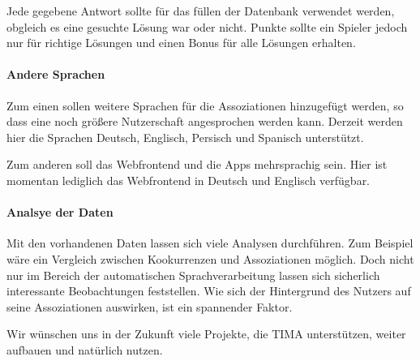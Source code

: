 Jede gegebene Antwort sollte für das füllen der Datenbank verwendet werden, obgleich
es eine gesuchte Lösung war oder nicht. Punkte sollte ein Spieler jedoch nur
für richtige Lösungen und einen Bonus für alle Lösungen erhalten.

\paragraph{Andere Sprachen}
Zum einen sollen weitere Sprachen für die Assoziationen hinzugefügt werden, so dass eine noch größere Nutzerschaft angesprochen werden kann. Derzeit werden hier die Sprachen Deutsch, Englisch, Persisch und Spanisch unterstützt.

Zum anderen soll das Webfrontend und die Apps mehrsprachig sein. Hier ist momentan lediglich das Webfrontend in Deutsch und Englisch verfügbar.

\paragraph{Analsye der Daten}
Mit den vorhandenen Daten lassen sich viele Analysen durchführen. Zum Beispiel wäre ein Vergleich zwischen Kookurrenzen und Assoziationen möglich. Doch nicht nur im Bereich der automatischen Sprachverarbeitung lassen sich sicherlich interessante Beobachtungen feststellen. Wie sich der Hintergrund des Nutzers auf seine Assoziationen auswirken, ist ein spannender Faktor.

Wir wünschen uns in der Zukunft viele Projekte, die TIMA unterstützen, weiter aufbauen und natürlich nutzen.